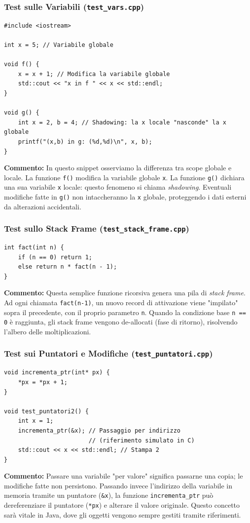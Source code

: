 \documentclass[12pt, a4paper]{article}
\begin{document}
\subsubsection{Test sulle Variabili (\texttt{test\_vars.cpp})}
\begin{verbatim}
#include <iostream>

int x = 5; // Variabile globale

void f() {
    x = x + 1; // Modifica la variabile globale
    std::cout << "x in f " << x << std::endl;
}

void g() {
    int x = 2, b = 4; // Shadowing: la x locale "nasconde" la x globale
    printf("(x,b) in g: (%d,%d)\n", x, b);
}
\end{verbatim}
\textbf{Commento:} In questo snippet osserviamo la differenza tra scope globale e locale. La funzione \texttt{f()} modifica la variabile globale \texttt{x}. La funzione \texttt{g()} dichiara una sua variabile \texttt{x} locale: questo fenomeno si chiama \textit{shadowing}. Eventuali modifiche fatte in \texttt{g()} non intaccheranno la \texttt{x} globale, proteggendo i dati esterni da alterazioni accidentali.

\subsubsection{Test sullo Stack Frame (\texttt{test\_stack\_frame.cpp})}
\begin{verbatim}
int fact(int n) {
    if (n == 0) return 1;
    else return n * fact(n - 1);
}
\end{verbatim}
\textbf{Commento:} Questa semplice funzione ricorsiva genera una pila di \textit{stack frame}. Ad ogni chiamata \texttt{fact(n-1)}, un nuovo record di attivazione viene "impilato" sopra il precedente, con il proprio parametro \texttt{n}. Quando la condizione base \texttt{n == 0} è raggiunta, gli stack frame vengono de-allocati (fase di ritorno), risolvendo l'albero delle moltiplicazioni.

\subsubsection{Test sui Puntatori e Modifiche (\texttt{test\_puntatori.cpp})}
\begin{verbatim}
void incrementa_ptr(int* px) {
    *px = *px + 1;
}

void test_puntatori2() {
    int x = 1;
    incrementa_ptr(&x); // Passaggio per indirizzo 
                        // (riferimento simulato in C)
    std::cout << x << std::endl; // Stampa 2
}
\end{verbatim}
\textbf{Commento:} Passare una variabile "per valore" significa passarne una copia; le modifiche fatte non persistono. Passando invece l'indirizzo della variabile in memoria tramite un puntatore (\texttt{\&x}), la funzione \texttt{incrementa\_ptr} può dereferenziare il puntatore (\texttt{*px}) e alterare il valore originale. Questo concetto sarà vitale in Java, dove gli oggetti vengono sempre gestiti tramite riferimenti.
\end{document}
